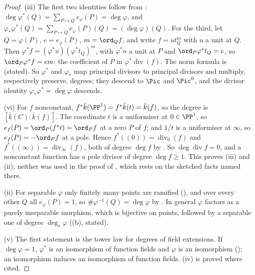 \begin{proof}
(iii) The first two identities follow from : $\deg\varphi^*(Q)=\sum_{P\mapsto Q}e_\varphi(P)=\deg\varphi$, and
$\varphi_*\varphi^*(Q)=\sum_{P\mapsto Q}e_\varphi(P)(Q)=(\deg\varphi)(Q)$. For the third, let $Q=\varphi(P)$, $e=e_\varphi(P)$, $m=\ord_Qf$, and write $f=ut_Q^m$ with $u$ a unit at $Q$. Then
$\varphi^*f=(\varphi^*u)(\varphi^*t_Q)^m$, with $\varphi^*u$ a unit at $P$ and $\ord_P\varphi^*t_Q=e$, so $\ord_P\varphi^*f=em$: the coefficient of $P$ in $\varphi^*\operatorname{div}(f)$.
The norm formula is \cite[Chapter II, Section 3]{SilvermanAEC} (stated). So $\varphi^*$ and $\varphi_*$ map principal divisors to principal divisors and multiply,
respectively preserve, degrees; they descend to $\Pic$ and $\Pic^0$, and the divisor identity $\varphi_*\varphi^*=\deg\varphi$ descends.

(vi) For $f$ nonconstant, $f^*\bar k(\PP^1)=f^*\bar k(t)=\bar k(f)$, so the degree is $[\bar k(C):\bar k(f)]$. The coordinate $t$ is a uniformiser at $0\in\PP^1$, so
$e_f(P)=\ord_P(f^*t)=\ord_Pf$ at a zero $P$ of $f$; and $1/t$ is a uniformiser at $\infty$, so $e_f(P)=-\ord_Pf$ at a pole. Hence $f^*((0))=\operatorname{div}_0(f)$ and
$f^*((\infty))=\operatorname{div}_\infty(f)$, both of degree $\deg f$ by . So $\deg\operatorname{div}f=0$, and a nonconstant function has a pole
divisor of degree $\deg f\ge1$. This proves (iii) and (ii); neither was used in the proof of
, which rests on the sketched facts named there.

(ii) For separable $\varphi$ only finitely many points are ramified (), and over every other $Q$ all $e_\varphi(P)=1$, so
$\#\varphi^{-1}(Q)=\deg\varphi$ by . In general $\varphi$ factors as a purely inseparable morphism, which is bijective on points, followed
by a separable one of degree $\deg_s\varphi$ ((b), stated).

(v) The first statement is the tower law for degrees of field extensions. If $\deg\varphi=1$, $\varphi^*$ is an isomorphism of function fields and $\varphi$ is an
isomorphism (); an isomorphism induces an isomorphism of function fields. (iv) is proved where cited.
\end{proof}

